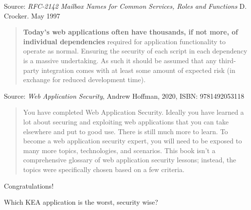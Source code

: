 \documentclass[Screen16to9,17pt]{foils}
\begin{document}
Source:
\emph{RFC-2142 Mailbox Names for Common Services, Roles and Functions} D.
Crocker. May 1997







\begin{quote}{\bf
Today’s web applications often have thousands, if not more, of individual dependencies} required for application functionality to operate as normal. Ensuring the security of each script in each dependency is a massive undertaking. As such it should be assumed that any third-party integration comes with at least some amount of
expected risk (in exchange for reduced development time).
\end{quote}
Source: \emph{Web Application Security}, Andrew Hoffman, 2020, ISBN: 9781492053118


\begin{list2}
    \item
\end{list2}





\begin{quote}
You have completed Web Application Security. Ideally you have learned a lot about
securing and exploiting web applications that you can take elsewhere and put to good
use. There is still much more to learn. To become a web application security expert,
you will need to be exposed to many more topics, technologies, and scenarios.
This book isn’t a comprehensive glossary of web application security lessons; instead,
the topics were specifically chosen based on a few criteria.
\end{quote}

\begin{list2}
\item Congratulations!
\end{list2}




\begin{list2}
\item Which KEA application is the worst, security wise?
\end{list2}



\slidenext{}
\end{document}
